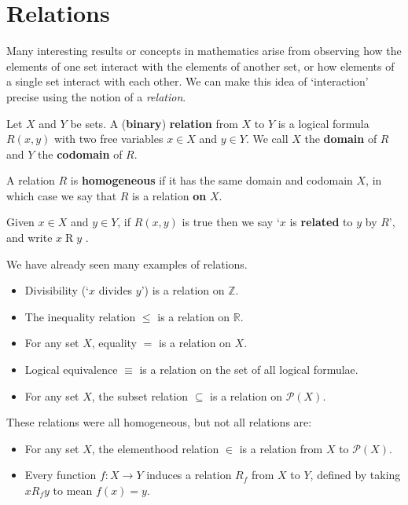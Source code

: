 \section{Relations}

Many interesting results or concepts in mathematics arise from observing how the elements of one set interact with the elements of another set, or how elements of a single set interact with each other. We can make this idea of `interaction' precise using the notion of a \textit{relation}.

\begin{definition}
Let $X$ and $Y$ be sets. A (\textbf{binary}) \textbf{relation} from $X$ to $Y$ is a logical formula $R(x,y)$ with two free variables $x \in X$ and $y \in Y$. We call $X$ the \textbf{domain} of $R$ and $Y$ the \textbf{codomain} of $R$.

A relation $R$ is \textbf{homogeneous} if it has the same domain and codomain $X$, in which case we say that $R$ is a relation \textbf{on} $X$.

Given $x \in X$ and $y \in Y$, if $R(x,y)$ is true then we say `$x$ is \textbf{related} to $y$ by $R$', and write $x \mathrel{R} y$ .
\end{definition}

\begin{example}
\label{exRelationExamples}
We have already seen many examples of relations.
\begin{itemize}
\item Divisibility (`$x$ divides $y$') is a relation on $\mathbb{Z}$.
\item The inequality relation $\le$ is a relation on $\mathbb{R}$.
\item For any set $X$, equality $=$ is a relation on $X$.
\item Logical equivalence $\equiv$ is a relation on the set of all logical formulae.
\item For any set $X$, the subset relation $\subseteq$ is a relation on $\mathcal{P}(X)$.
\end{itemize}
These relations were all homogeneous, but not all relations are:
\begin{itemize}
\item For any set $X$, the elementhood relation $\in$ is a relation from $X$ to $\mathcal{P}(X)$.
\item Every function $f : X \to Y$ induces a relation $R_f$ from $X$ to $Y$, defined by taking $x \mathrel{R_f} y$ to mean $f(x) = y$.
\end{itemize}
\end{example}

